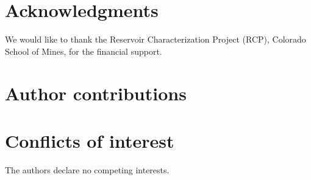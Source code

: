 \documentclass[11pt,a4paper]{article}
\begin{document}
\section*{Acknowledgments}
We would like to thank the Reservoir Characterization Project (RCP), Colorado School of Mines, for the financial support.

\section*{Author contributions}

\section*{Conflicts of interest}
The authors declare no competing interests.



\end{document}
